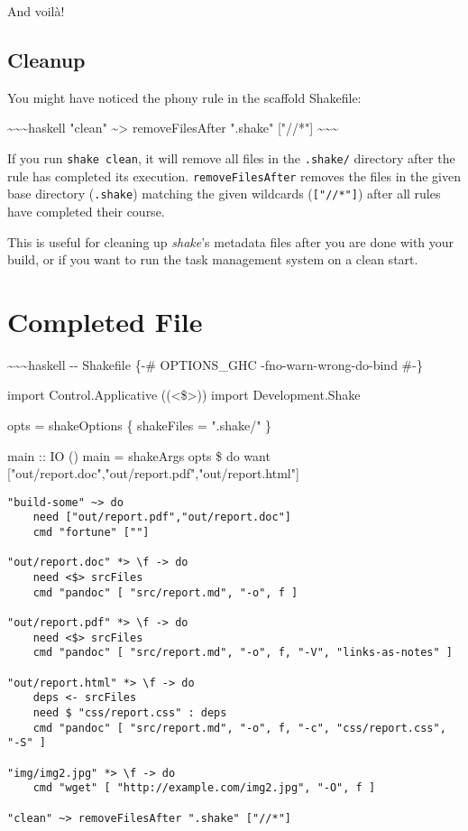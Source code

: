\documentclass[]{article}
\begin{document}
And voilà!

\subsection{Cleanup}

You might have noticed the phony rule in the scaffold Shakefile:

\textasciitilde{}\textasciitilde{}\textasciitilde{}haskell "clean"
\textasciitilde{}\textgreater{} removeFilesAfter ".shake" {[}"//*"{]}
\textasciitilde{}\textasciitilde{}\textasciitilde{}

If you run \texttt{shake\ clean}, it will remove all files in the
\texttt{.shake/} directory after the rule has completed its execution.
\texttt{removeFilesAfter} removes the files in the given base directory
(\texttt{.shake}) matching the given wildcards (\texttt{{[}"//*"{]}}) after all
rules have completed their course.

This is useful for cleaning up \emph{shake}'s metadata files after you are done
with your build, or if you want to run the task management system on a clean
start.

\section{Completed File}

\textasciitilde{}\textasciitilde{}\textasciitilde{}haskell -\/- Shakefile \{-\#
OPTIONS\_GHC -fno-warn-wrong-do-bind \#-\}

import Control.Applicative ((\textless{}\$\textgreater{})) import
Development.Shake

opts = shakeOptions \{ shakeFiles = ".shake/" \}

main :: IO () main = shakeArgs opts \$ do want
{[}"out/report.doc","out/report.pdf","out/report.html"{]}

\begin{verbatim}
"build-some" ~> do
    need ["out/report.pdf","out/report.doc"]
    cmd "fortune" [""]

"out/report.doc" *> \f -> do
    need <$> srcFiles
    cmd "pandoc" [ "src/report.md", "-o", f ]

"out/report.pdf" *> \f -> do
    need <$> srcFiles
    cmd "pandoc" [ "src/report.md", "-o", f, "-V", "links-as-notes" ]

"out/report.html" *> \f -> do
    deps <- srcFiles
    need $ "css/report.css" : deps
    cmd "pandoc" [ "src/report.md", "-o", f, "-c", "css/report.css", "-S" ]

"img/img2.jpg" *> \f -> do
    cmd "wget" [ "http://example.com/img2.jpg", "-O", f ]

"clean" ~> removeFilesAfter ".shake" ["//*"]
\end{verbatim}
\end{document}
